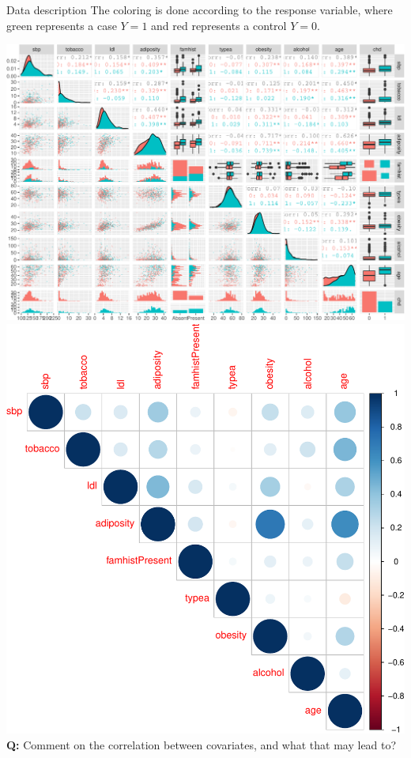 \documentclass[
  ignorenonframetext,
]{beamer}
\begin{document}
\begin{frame}[fragile]
\begin{block}{Data description}
The coloring is done according to the response variable, where green
represents a case \(Y=1\) and red represents a control \(Y=0\).

\includegraphics{L3_files/figure-beamer/unnamed-chunk-5-1.pdf}
\includegraphics{L3_files/figure-beamer/unnamed-chunk-5-2.pdf}
\textbf{Q:} Comment on the correlation between covariates, and what that
may lead to?

\end{block}

\end{frame}
\end{document}
